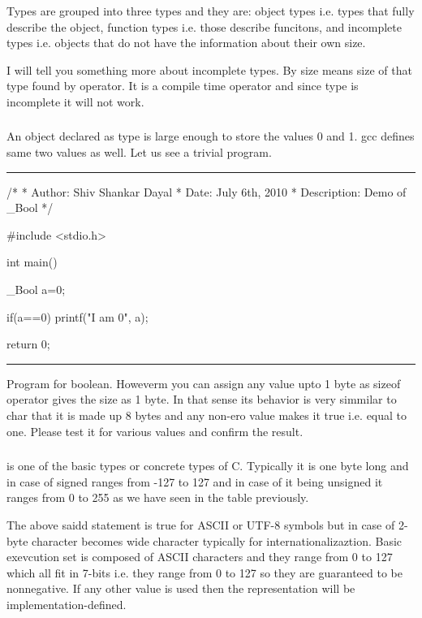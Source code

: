 Types are grouped into three types and they are: object types
i.e. types that fully describe the object, function types i.e. those
describe funcitons, and incomplete types i.e. objects that do not have
the information about their own size.

I will tell you something more about incomplete types. By size means
size of that type found by  operator. It is a compile
time operator and since type is incomplete it will not work.

\subsubsection{}
An object declared as type  is large enough to store the
values 0 and 1. gcc defines same two values as well. Let us see a
trivial program.
\blank[force,1mm]\hrule\blank[force,1mm]
\startCPP
/*
 * Author: Shiv Shankar Dayal
 * Date: July 6th, 2010
 * Description: Demo of _Bool
 */

#include <stdio.h>

int main()
{
  _Bool a=0;

   if(a==0)
   {
     printf("I am 0\n", a);
   }

   return 0;
}
\stopCPP
{}
\hrule
\blank[force,1mm]
\startalignment[middle]
Program for boolean.
\stopalignment
Howeverm you can assign any value upto 1 byte as sizeof operator gives
the size as 1 byte. In that sense its behavior is very simmilar to
char that it is made up 8 bytes and any non-ero value makes it true
i.e. equal to one. Please test it for various values and confirm the
result.

\subsubsection{}
 is one of the basic types or concrete types of C. Typically it is
one byte long and in case of signed ranges from -127 to 127 and in case of it
being unsigned it ranges from 0 to 255 as we have seen in the table previously.

The above saidd statement is true for ASCII or UTF-8 symbols but in case of
2-byte character becomes wide character typically for internationalizaztion.
Basic exevcution set is composed of ASCII characters and they range from 0 to
127 which all fit in 7-bits i.e. they range from 0 to 127 so they are guaranteed
to be nonnegative. If any other value is used then the representation will be
implementation-defined.

